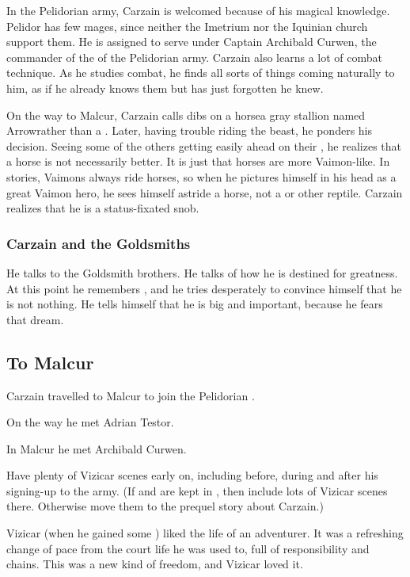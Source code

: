 \begin{garbage}
In the Pelidorian army, Carzain is welcomed because of his magical knowledge. Pelidor has few mages, since neither the Imetrium nor the Iquinian church support them. He is assigned to serve under Captain Archibald Curwen, the commander of the \ishrah{} of the Pelidorian army.  
Carzain also learns a lot of combat technique. As he studies combat, he finds all sorts of things coming naturally to him, as if he already knows them but has just forgotten he knew. 

On the way to Malcur, Carzain calls dibs on a horse\dash a gray stallion named Arrow\dash rather than a \relc. Later, having trouble riding the beast, he ponders his decision. Seeing some of the others getting easily ahead on their \relcs, he realizes that a horse is not necessarily better. It is just that horses are more Vaimon-like. In stories, Vaimons always ride horses, so when he pictures himself in his head as a great Vaimon hero, he sees himself astride a horse, not a \relc{} or other reptile. Carzain realizes that he is a status-fixated snob. 





\subsubsection{Carzain and the Goldsmiths}
He talks to the Goldsmith brothers. 
He talks of how he is destined for greatness. 
At this point he remembers , and he tries desperately to convince himself that he is not nothing. 
He tells himself that he is big and important, because he fears that dream. 









\subsection{To Malcur}
Carzain travelled to Malcur to join the Pelidorian \ishrah{}.

On the way he met Adrian Testor. 

In Malcur he met Archibald Curwen. 

Have plenty of Vizicar scenes early on, including before, during and after his signing-up to the army. 
(If  and  are kept in \emph{\TwilightAngelRemember}, then include lots of Vizicar scenes there. Otherwise move them to the prequel story about Carzain.)

Vizicar (when he gained some \kenosis) liked the life of an adventurer. 
It was a refreshing change of pace from the court life he was used to, full of responsibility and chains. 
This was a new kind of freedom, and Vizicar loved it. 





\end{garbage}
